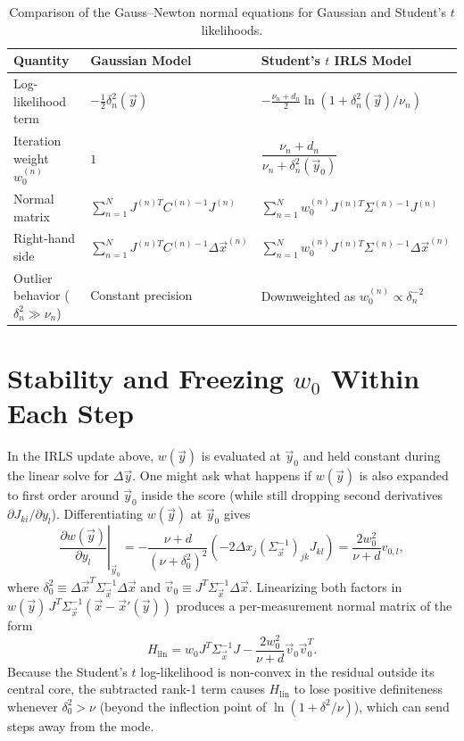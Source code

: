 \documentclass[11pt, a4paper]{article}
\begin{document}
\begin{table}[h]
\centering
\small
\begin{tabular}{@{}lll@{}}
\toprule
\textbf{Quantity} & \textbf{Gaussian Model} & \textbf{Student's $t$ IRLS Model} \\
\midrule
Log-likelihood term & $-\frac{1}{2} \delta_n^2(\vec{y})$ & $-\frac{\nu_n + d_n}{2} \ln\!\left(1 + \delta_n^2(\vec{y}) / \nu_n\right)$ \\[0.35em]
Iteration weight $w_0^{(n)}$ & $1$ & $\dfrac{\nu_n + d_n}{\nu_n + \delta_n^2(\vec{y}_0)}$ \\[0.75em]
Normal matrix & $\sum_{n=1}^N J^{(n)T} C^{(n)-1} J^{(n)}$ & $\sum_{n=1}^N w_0^{(n)} J^{(n)T} \Sigma^{(n)-1} J^{(n)}$ \\[0.5em]
Right-hand side & $\sum_{n=1}^N J^{(n)T} C^{(n)-1} \Delta \vec{x}^{(n)}$ & $\sum_{n=1}^N w_0^{(n)} J^{(n)T} \Sigma^{(n)-1} \Delta \vec{x}^{(n)}$ \\[0.5em]
Outlier behavior ($\delta_n^2 \gg \nu_n$) & Constant precision & Downweighted as $w_0^{(n)} \propto \delta_n^{-2}$ \\
\bottomrule
\end{tabular}
\caption{Comparison of the Gauss--Newton normal equations for Gaussian and Student's $t$ likelihoods.}
\end{table}

\section{Stability and Freezing $w_0$ Within Each Step}

In the IRLS update above, $w(\vec{y})$ is evaluated at $\vec{y}_0$ and held constant during the linear solve for $\Delta \vec{y}$. One might ask what happens if $w(\vec{y})$ is also expanded to first order around $\vec{y}_0$ inside the score (while still dropping second derivatives $\partial J_{ki} / \partial y_l$). Differentiating $w(\vec{y})$ at $\vec{y}_0$ gives
\begin{equation}
\left.\frac{\partial w(\vec{y})}{\partial y_l}\right|_{\vec{y}_0} = -\frac{\nu + d}{\left(\nu + \delta_0^2\right)^2} \left( -2 \Delta x_j (\Sigma_{\vec{x}}^{-1})_{jk} J_{kl} \right) = \frac{2 w_0^2}{\nu + d} v_{0,l},
\end{equation}
where $\delta_0^2 \equiv \Delta \vec{x}^T \Sigma_{\vec{x}}^{-1} \Delta \vec{x}$ and $\vec{v}_0 \equiv J^T \Sigma_{\vec{x}}^{-1} \Delta \vec{x}$. Linearizing both factors in $w(\vec{y}) \, J^T \Sigma_{\vec{x}}^{-1} (\vec{x} - \vec{x}'(\vec{y}))$ produces a per-measurement normal matrix of the form
\begin{equation}
H_{\text{lin}} = w_0 J^T \Sigma_{\vec{x}}^{-1} J - \frac{2 w_0^2}{\nu + d} \vec{v}_0 \vec{v}_0^T.
\end{equation}
Because the Student's $t$ log-likelihood is non-convex in the residual outside its central core, the subtracted rank-1 term causes $H_{\text{lin}}$ to lose positive definiteness whenever $\delta_0^2 > \nu$ (beyond the inflection point of $\ln(1 + \delta^2/\nu)$), which can send steps away from the mode.
\end{document}
